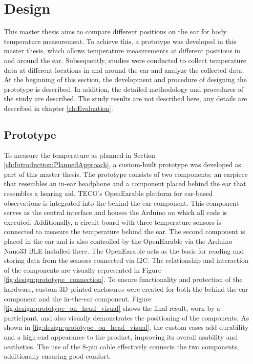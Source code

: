 \chapter{Design}
\label{ch:Design}
This master thesis aims to compare different positions on the ear for body temperature measurement. 
To achieve this, a prototype was developed in this master thesis, which allows temperature measurements at different positions in and around the ear. 
Subsequently, studies were conducted to collect temperature data at different locations in and around the ear and analyze the collected data.
At the beginning of this section, the development and procedure of designing the prototype is described.
In addition, the detailed methodology and procedures of the study are described.
The study results are not described here, any details are described in chapter \ref{ch:Evaluation}. 

\section{Prototype}
\label{ch:Design:Prototype}
To measure the temperature as planned in Section \ref{ch:Introduction:PlannedApproach}, a custom-built prototype was developed as part of this master thesis.
The prototype consists of two components: an earpiece that resembles an in-ear headphone and a component placed behind the ear that resembles a hearing aid. TECO's OpenEarable platform for ear-based observations is integrated into the behind-the-ear component. This component serves as the central interface and houses the Arduino on which all code is executed. Additionally, a circuit board with three temperature sensors is connected to measure the temperature behind the ear.
The second component is placed in the ear and is also controlled by the OpenEarable via the Arduino Nano33 BLE installed there. The OpenEarable acts as the basis for reading and storing data from the sensors connected via I2C. The relationship and interaction of the components are visually represented in Figure \ref{fig:design:prototype_connection}.
To ensure functionality and protection of the hardware, custom 3D-printed enclosures were created for both the behind-the-ear component and the in-the-ear component. 
Figure \ref{fig:design:prototype_on_head_visual} shows the final result, worn by a participant, and also visually demonstrates the positioning of the components.
As shown in \ref{fig:design:prototype_on_head_visual}, the custom cases add durability and a high-end appearance to the product, improving its overall usability and aesthetics.
The use of the 8-pin cable effectively connects the two components, additionally ensuring good comfort.

